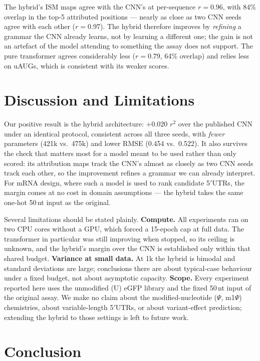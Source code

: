 \documentclass{article}
\begin{document}
The hybrid's ISM maps agree with the CNN's at per-sequence $r = 0.96$, with 84\% overlap in
the top-5 attributed positions --- nearly as close as two CNN seeds agree with each other
($r = 0.97$). The hybrid therefore improves by \emph{refining} a grammar the CNN already
learns, not by learning a different one; the gain is not an artefact of the model attending
to something the assay does not support. The pure transformer agrees considerably less
($r = 0.79$, 64\% overlap) and relies less on uAUGs, which is consistent with its weaker
scores.

\section{Discussion and Limitations}

Our positive result is the hybrid architecture: $+0.020$ $r^2$ over the published CNN under
an identical protocol, consistent across all three seeds, with \emph{fewer} parameters
(421k vs.\ 475k) and lower RMSE (0.454 vs.\ 0.522). It also survives the check that matters
most for a model meant to be used rather than only scored: its attribution maps track the
CNN's almost as closely as two CNN seeds track each other, so the improvement refines a
grammar we can already interpret. For mRNA design, where such a model is used to rank
candidate 5$'$UTRs, the margin comes at no cost in domain assumptions --- the hybrid takes
the same one-hot 50\,nt input as the original.

Several limitations should be stated plainly. \textbf{Compute.} All experiments ran on two
CPU cores without a GPU, which forced a 15-epoch cap at full data. The transformer in
particular was still improving when stopped, so its ceiling is unknown, and the hybrid's
margin over the CNN is established only within that shared budget. \textbf{Variance at small
data.} At 1k the hybrid is bimodal and standard deviations are large; conclusions there are
about typical-case behaviour under a fixed budget, not about asymptotic capacity.
\textbf{Scope.} Every experiment reported here uses the unmodified (U) eGFP library and the
fixed 50\,nt input of the original assay. We make no claim about the modified-nucleotide
($\Psi$, m1$\Psi$) chemistries, about variable-length 5$'$UTRs, or about variant-effect
prediction; extending the hybrid to those settings is left to future work.

\section{Conclusion}
\end{document}
